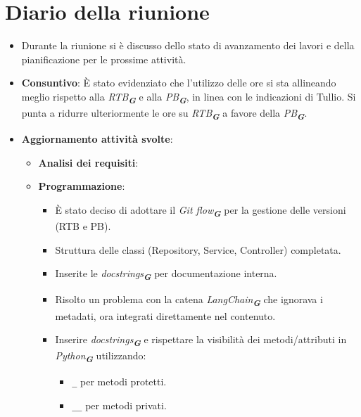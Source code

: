 
\section{Diario della riunione}

\begin{itemize}
    \item Durante la riunione si è discusso dello stato di avanzamento dei lavori e della pianificazione per le prossime attività.  

    \item \textbf{Consuntivo}:  
    È stato evidenziato che l'utilizzo delle ore si sta allineando meglio rispetto alla \emph{RTB}\textsubscript{\textit{\textbf{G}}} e alla \emph{PB}\textsubscript{\textit{\textbf{G}}}, in linea con le indicazioni di Tullio. Si punta a ridurre ulteriormente le ore su \emph{RTB}\textsubscript{\textit{\textbf{G}}} a favore della \emph{PB}\textsubscript{\textit{\textbf{G}}}.  

    \item \textbf{Aggiornamento attività svolte}:  
    \begin{itemize}
        \item \textbf{Analisi dei requisiti}:  

        \item \textbf{Programmazione}:  
        \begin{itemize}
            \item È stato deciso di adottare il \emph{Git flow}\textsubscript{\textit{\textbf{G}}} per la gestione delle versioni (RTB e PB). 
            \item Struttura delle classi (Repository, Service, Controller) completata.  
            \item Inserite le \emph{docstrings}\textsubscript{\textit{\textbf{G}}} per documentazione interna.  
            \item Risolto un problema con la catena \emph{LangChain}\textsubscript{\textit{\textbf{G}}} che ignorava i metadati, ora integrati direttamente nel contenuto.  
            \item Inserire \emph{docstrings}\textsubscript{\textit{\textbf{G}}} e rispettare la visibilità dei metodi/attributi in \emph{Python}\textsubscript{\textit{\textbf{G}}} utilizzando:  
            \begin{itemize}
                \item \texttt{\_} per metodi protetti.  
                \item \texttt{\_\_} per metodi privati.  
            \end{itemize}
        \end{itemize}


\end{itemize}
\end{itemize}
